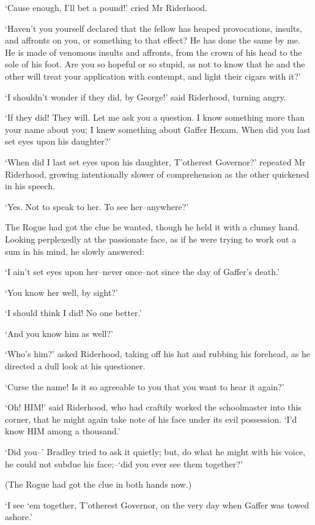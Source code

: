 ‘Cause enough, I’ll bet a pound!’ cried Mr Riderhood.

‘Haven’t you yourself declared that the fellow has heaped provocations,
insults, and affronts on you, or something to that effect? He has done
the same by me. He is made of venomous insults and affronts, from the
crown of his head to the sole of his foot. Are you so hopeful or so
stupid, as not to know that he and the other will treat your application
with contempt, and light their cigars with it?’

‘I shouldn’t wonder if they did, by George!’ said Riderhood, turning
angry.

‘If they did! They will. Let me ask you a question. I know something
more than your name about you; I knew something about Gaffer Hexam. When
did you last set eyes upon his daughter?’

‘When did I last set eyes upon his daughter, T’otherest Governor?’
repeated Mr Riderhood, growing intentionally slower of comprehension as
the other quickened in his speech.

‘Yes. Not to speak to her. To see her--anywhere?’

The Rogue had got the clue he wanted, though he held it with a clumsy
hand. Looking perplexedly at the passionate face, as if he were trying
to work out a sum in his mind, he slowly answered:

‘I ain’t set eyes upon her--never once--not since the day of Gaffer’s
death.’

‘You know her well, by sight?’

‘I should think I did! No one better.’

‘And you know him as well?’

‘Who’s him?’ asked Riderhood, taking off his hat and rubbing his
forehead, as he directed a dull look at his questioner.

‘Curse the name! Is it so agreeable to you that you want to hear it
again?’

‘Oh! HIM!’ said Riderhood, who had craftily worked the schoolmaster into
this corner, that he might again take note of his face under its evil
possession. ‘I’d know HIM among a thousand.’

‘Did you--’ Bradley tried to ask it quietly; but, do what he might
with his voice, he could not subdue his face;--‘did you ever see them
together?’

(The Rogue had got the clue in both hands now.)

‘I see ‘em together, T’otherest Governor, on the very day when Gaffer
was towed ashore.’

